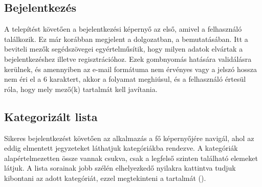 \subsection{Bejelentkezés}
A telepítést követően a bejelentkezési képernyő az első, amivel a felhasználó találkozik. Ez már korábban megjelent a dolgozatban, a  bemutatásában. Itt a beviteli mezők segédszövegei egyértelműsítik, hogy milyen adatok elvártak a bejelentkezéshez illetve regisztrációhoz. Ezek gombnyomás hatására validálásra kerülnek, és amennyiben az e-mail formátuma nem érvényes vagy a jelszó hossza nem éri el a 6 karaktert, akkor a folyamat meghiúsul, és a felhasználó értesül róla, hogy mely mező(k) tartalmát kell javítania. 

\subsection{Kategorizált lista}
Sikeres bejelentkezést követően az alkalmazás a fő képernyőjére navigál, ahol az eddig elmentett jegyzeteket láthatjuk kategóriákba rendezve. A kategóriák alapértelmezetten össze vannak csukva, csak a legfelső szinten található elemeket látjuk. A lista sorainak jobb szélén elhelyezkedő nyilakra kattintva tudjuk kibontani az adott kategóriát, ezzel megtekinteni a tartalmát ().

